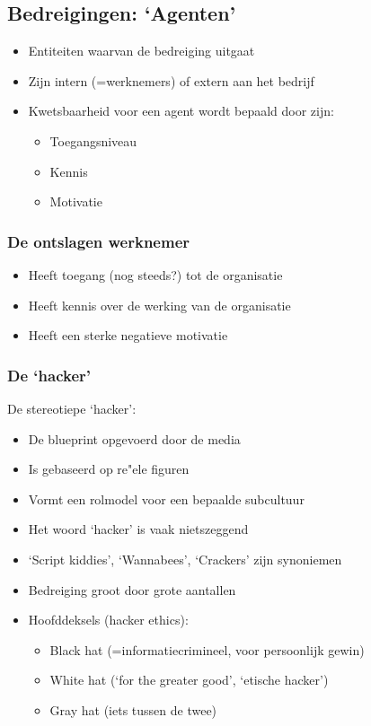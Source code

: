 \documentclass{article}
\begin{document}
\subsection{Bedreigingen: `Agenten'}

\begin{itemize}
    \item Entiteiten waarvan de bedreiging uitgaat
    \item Zijn intern (=werknemers) of extern aan het bedrijf
    \item Kwetsbaarheid voor een agent wordt bepaald door zijn: 
    \begin{itemize}
        \item Toegangsniveau
        \item Kennis
        \item Motivatie
    \end{itemize}
\end{itemize}

\subsubsection{De ontslagen werknemer}
\begin{itemize}
    \item Heeft toegang (nog steeds?) tot de organisatie
    \item Heeft kennis over de werking van de organisatie
    \item Heeft een sterke negatieve motivatie
\end{itemize}

\subsubsection{De `hacker'}
De stereotiepe `hacker':
\begin{itemize}
    \item De blueprint opgevoerd door de media
    \item Is gebaseerd op re"ele figuren
    \item Vormt een rolmodel voor een bepaalde subcultuur
    \item Het woord `hacker' is vaak nietszeggend
    \item `Script kiddies', `Wannabees', `Crackers' zijn synoniemen
    \item Bedreiging groot door grote aantallen
    \item Hoofddeksels (hacker ethics):
    \begin{itemize}
        \item Black hat (=informatiecrimineel, voor persoonlijk gewin)
        \item White hat (`for the greater good', `etische hacker')
        \item Gray hat (iets tussen de twee)
    \end{itemize}
\end{itemize}
\end{document}
